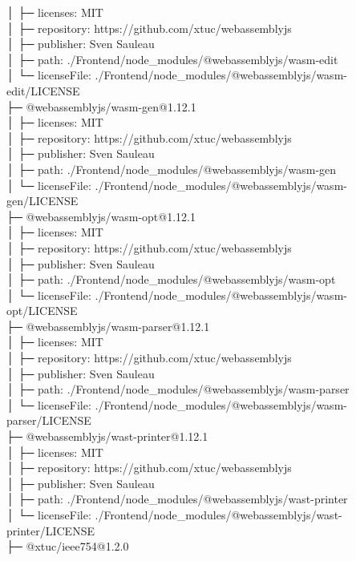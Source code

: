 │  ├─ licenses: MIT\\
│  ├─ repository: https://github.com/xtuc/webassemblyjs\\
│  ├─ publisher: Sven Sauleau\\
│  ├─ path: ./Frontend/node\_modules/@webassemblyjs/wasm-edit\\
│  └─ licenseFile: ./Frontend/node\_modules/@webassemblyjs/wasm-edit/LICENSE\\
├─ @webassemblyjs/wasm-gen@1.12.1\\
│  ├─ licenses: MIT\\
│  ├─ repository: https://github.com/xtuc/webassemblyjs\\
│  ├─ publisher: Sven Sauleau\\
│  ├─ path: ./Frontend/node\_modules/@webassemblyjs/wasm-gen\\
│  └─ licenseFile: ./Frontend/node\_modules/@webassemblyjs/wasm-gen/LICENSE\\
├─ @webassemblyjs/wasm-opt@1.12.1\\
│  ├─ licenses: MIT\\
│  ├─ repository: https://github.com/xtuc/webassemblyjs\\
│  ├─ publisher: Sven Sauleau\\
│  ├─ path: ./Frontend/node\_modules/@webassemblyjs/wasm-opt\\
│  └─ licenseFile: ./Frontend/node\_modules/@webassemblyjs/wasm-opt/LICENSE\\
├─ @webassemblyjs/wasm-parser@1.12.1\\
│  ├─ licenses: MIT\\
│  ├─ repository: https://github.com/xtuc/webassemblyjs\\
│  ├─ publisher: Sven Sauleau\\
│  ├─ path: ./Frontend/node\_modules/@webassemblyjs/wasm-parser\\
│  └─ licenseFile: ./Frontend/node\_modules/@webassemblyjs/wasm-parser/LICENSE\\
├─ @webassemblyjs/wast-printer@1.12.1\\
│  ├─ licenses: MIT\\
│  ├─ repository: https://github.com/xtuc/webassemblyjs\\
│  ├─ publisher: Sven Sauleau\\
│  ├─ path: ./Frontend/node\_modules/@webassemblyjs/wast-printer\\
│  └─ licenseFile: ./Frontend/node\_modules/@webassemblyjs/wast-printer/LICENSE\\
├─ @xtuc/ieee754@1.2.0\\
